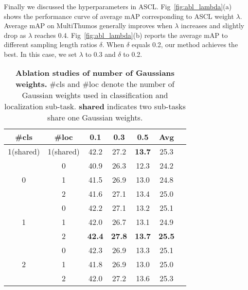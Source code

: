 \documentclass[10pt,twocolumn,letterpaper]{article}
\begin{document}
\par Finally we discussed the hyperparameters in ASCL. Fig~\ref{fig:abl_lambda}(a) shows the performance curve of average mAP corresponding to ASCL weight $\lambda$. Average mAP on MultiThumos generally improves when $\lambda$ increases and slightly drop as $\lambda$ reaches 0.4. Fig~\ref{fig:abl_lambda}(b) reports the average mAP to different sampling length ratios $\delta$. When $\delta$ equals 0.2, our method achieves the best. In this case, we set $\lambda$ to 0.3 and $\delta$ to 0.2. 

\begin{table}[t]
\centering
\small
\caption{\label{tab:abl_numgaussian}\textbf{Ablation studies of number of Gaussians weights.} \#cls and \#loc denote the number of Gaussian weights used in classification and localization sub-task. \textbf{shared} indicates two sub-tasks share one Gaussian weights.}
\vspace{0.5em}
\small
\begin{tabular}{c|c|ccccc}
        \toprule
	{\#cls} & {\#loc} & 0.1 &0.3 &  0.5 & Avg\\
		\hline
        1(shared) & 1(shared)     & 42.2 & 27.2 & \textbf{13.7} &25.3 \\ 
        \hline
	\multirow{3}{*}{0} & 0     & 40.9 & 26.3 & 12.3  &  24.2      \\
	& 1                        & 41.5 &  26.9 & 13.0 & 24.8\\
	& 2                        & 41.6 &  27.1  & 13.4 & 25.0 \\
	\hline
	\multirow{3}{*}{1} & 0     & 42.2 & 27.1 & 13.2 & 25.1 \\
	& 1                        & 42.0 & 26.7 & 13.1 & 24.9 \\
	& 2                        & \textbf{42.4} & \textbf{27.8} & \textbf{13.7} &\textbf{25.5} \\
        \hline
        \multirow{3}{*}{2} & 0     & 42.3 & 26.9 & 13.3 &    25.1 \\
	& 1                        & 41.8 & 26.9 & 13.0 &    25.0 \\
	& 2                        & 42.0 & 27.2 & 13.6 &   25.3 \\
        \bottomrule
\end{tabular}
\vspace{-0.5em}
\end{table}
\end{document}
